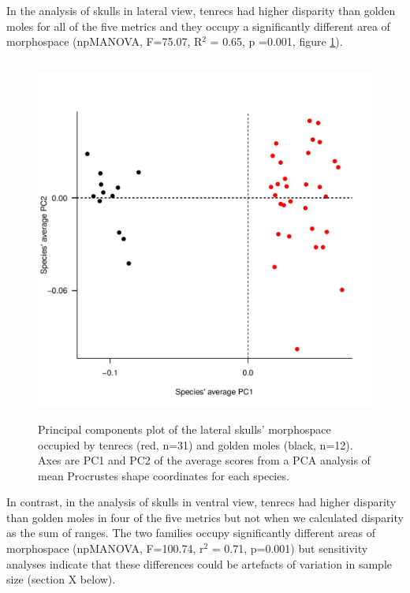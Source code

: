 \documentclass[12pt,a4paper]{article}
\begin{document}
In the analysis of skulls in lateral view, tenrecs had higher disparity than golden moles for all of the five metrics and they occupy a significantly different area of morphospace (npMANOVA, F=75.07, R$^{2}$ = 0.65,  p =0.001, figure \ref{fig:sklatPCA}).  


\begin{figure}[H]
\centering
\includegraphics[width=12cm, height=12cm, keepaspectratio=true]
{figures/sklat_tenrec+gmole_PCA.jpg}
\caption{Principal components plot of the lateral skulls' morphospace occupied by tenrecs (red, n=31) and golden moles (black, n=12). Axes are PC1 and PC2 of the average scores from a PCA analysis of mean Procrustes shape coordinates for each species. }
\label{fig:sklatPCA}
\end{figure}


In contrast, in the analysis of skulls in ventral view, tenrecs had higher disparity than golden moles in four of the five metrics but not when we calculated disparity as the sum of ranges.
The two families occupy significantly different areas of morphospace (npMANOVA, F=100.74, r$^{2}$ = 0.71, p=0.001) but sensitivity analyses indicate that these differences could be artefacts of variation in sample size (section X below).
\end{document}
